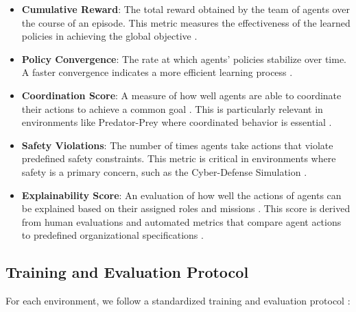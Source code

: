 \documentclass[sigconf,anonymous]{aamas}
\begin{document}
\begin{itemize}
    \item \textbf{Cumulative Reward}: The total reward obtained by the team of agents over the course of an episode. This metric measures the effectiveness of the learned policies in achieving the global objective \cite{foerster2016learning, lowe2017multi}.
    \item \textbf{Policy Convergence}: The rate at which agents' policies stabilize over time. A faster convergence indicates a more efficient learning process \cite{lowe2017multi, foerster2018counterfactual}.
    \item \textbf{Coordination Score}: A measure of how well agents are able to coordinate their actions to achieve a common goal \cite{foerster2018counterfactual}. This is particularly relevant in environments like Predator-Prey where coordinated behavior is essential \cite{foerster2016learning}.
    \item \textbf{Safety Violations}: The number of times agents take actions that violate predefined safety constraints. This metric is critical in environments where safety is a primary concern, such as the Cyber-Defense Simulation \cite{bastani2018verifiable, wei2019safe}.
    \item \textbf{Explainability Score}: An evaluation of how well the actions of agents can be explained based on their assigned roles and missions \cite{ghosal2021explainable}. This score is derived from human evaluations and automated metrics that compare agent actions to predefined organizational specifications \cite{su2021toward}.
\end{itemize}

\subsection{Training and Evaluation Protocol}
For each environment, we follow a standardized training and evaluation protocol \cite{foerster2018counterfactual, soule2024}:
\end{document}
